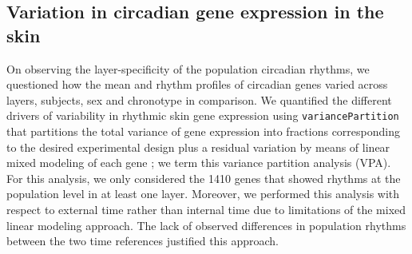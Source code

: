 

\subsection*{Variation in circadian gene expression in the skin}
On observing the layer-specificity of the population circadian rhythms, we questioned how the mean and rhythm profiles of circadian genes varied across layers, subjects, sex and chronotype in comparison. We quantified the different drivers of variability in rhythmic skin gene expression using \texttt{variancePartition} that partitions the total variance of gene expression into fractions corresponding to the desired experimental design plus a residual variation by means of linear mixed modeling of each gene \cite{Hoffman2016}; we term this variance partition analysis (VPA). For this analysis, we only considered the 1410 genes that showed rhythms at the population level in at least one layer. Moreover, we performed this analysis with respect to external time rather than internal time due to limitations of the mixed linear modeling approach. The lack of observed differences in population rhythms between the two time references justified this approach.

